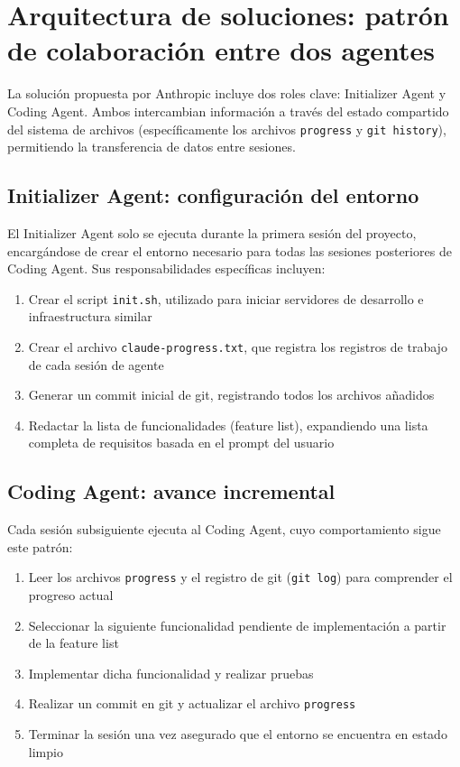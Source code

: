\section{Arquitectura de soluciones: patrón de colaboración entre dos agentes}

La solución propuesta por Anthropic incluye dos roles clave: Initializer Agent y Coding Agent. Ambos intercambian información a través del estado compartido del sistema de archivos (específicamente los archivos \texttt{progress} y \texttt{git history}), permitiendo la transferencia de datos entre sesiones.

\subsection{Initializer Agent: configuración del entorno}

El Initializer Agent solo se ejecuta durante la primera sesión del proyecto, encargándose de crear el entorno necesario para todas las sesiones posteriores de Coding Agent. Sus responsabilidades específicas incluyen:

\begin{enumerate}
    \item Crear el script \texttt{init.sh}, utilizado para iniciar servidores de desarrollo e infraestructura similar
    \item Crear el archivo \texttt{claude-progress.txt}, que registra los registros de trabajo de cada sesión de agente
    \item Generar un commit inicial de git, registrando todos los archivos añadidos
    \item Redactar la lista de funcionalidades (feature list), expandiendo una lista completa de requisitos basada en el prompt del usuario
\end{enumerate}

\subsection{Coding Agent: avance incremental}

Cada sesión subsiguiente ejecuta al Coding Agent, cuyo comportamiento sigue este patrón:

\begin{enumerate}
    \item Leer los archivos \texttt{progress} y el registro de git (\texttt{git log}) para comprender el progreso actual
    \item Seleccionar la siguiente funcionalidad pendiente de implementación a partir de la feature list
    \item Implementar dicha funcionalidad y realizar pruebas
    \item Realizar un commit en git y actualizar el archivo \texttt{progress}
    \item Terminar la sesión una vez asegurado que el entorno se encuentra en estado limpio
\end{enumerate}

